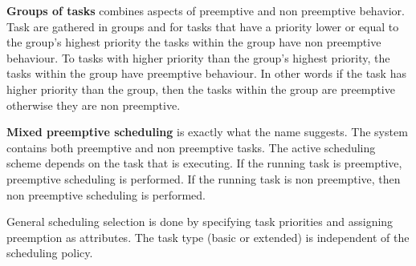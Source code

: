\textbf{Groups of tasks} combines aspects of preemptive and non preemptive behavior. Task are gathered in groups and for tasks that have a priority lower or equal to the group's highest priority the tasks within the group have non preemptive behaviour. To tasks with higher priority than the group's highest priority, the tasks within the group have preemptive behaviour. In other words if the task has higher priority than the group, then the tasks within the group are preemptive otherwise they are non preemptive.

\textbf{Mixed preemptive scheduling} is exactly what the name suggests. The system contains both preemptive and non preemptive tasks. The active scheduling scheme depends on the task that is executing. If the running task is preemptive, preemptive scheduling is performed. If the running task is non preemptive, then non preemptive scheduling is performed. 

General scheduling selection is done by specifying task priorities and assigning preemption as attributes. The task type (basic or extended) is independent of the scheduling policy. 

